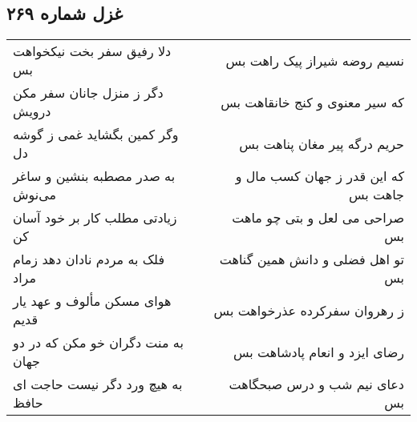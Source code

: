 \begin{center}
\section*{غزل شماره ۲۶۹}
\label{sec:sh269}
\begin{longtable}{l p{0.5cm} r}
دلا رفیق سفر بخت نیکخواهت بس
&&
نسیم روضه شیراز پیک راهت بس
\\
دگر ز منزل جانان سفر مکن درویش
&&
که سیر معنوی و کنج خانقاهت بس
\\
وگر کمین بگشاید غمی ز گوشه دل
&&
حریم درگه پیر مغان پناهت بس
\\
به صدر مصطبه بنشین و ساغر می‌نوش
&&
که این قدر ز جهان کسب مال و جاهت بس
\\
زیادتی مطلب کار بر خود آسان کن
&&
صراحی می لعل و بتی چو ماهت بس
\\
فلک به مردم نادان دهد زمام مراد
&&
تو اهل فضلی و دانش همین گناهت بس
\\
هوای مسکن مألوف و عهد یار قدیم
&&
ز رهروان سفرکرده عذرخواهت بس
\\
به منت دگران خو مکن که در دو جهان
&&
رضای ایزد و انعام پادشاهت بس
\\
به هیچ ورد دگر نیست حاجت ای حافظ
&&
دعای نیم شب و درس صبحگاهت بس
\\
\end{longtable}
\end{center}
